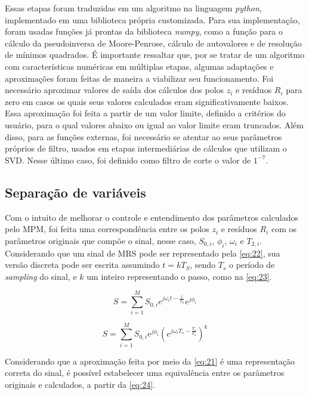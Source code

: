 \documentclass[12pt]{article}
\begin{document}
Essas etapas foram traduzidas em um algoritmo na linguagem \textit{python}, implementado em uma biblioteca própria customizada. Para sua implementação, 
foram usadas funções já prontas da biblioteca \textit{numpy}, como a função para o cálculo da pseudoinversa de Moore-Penrose, cálculo de autovalores e de resolução de 
mínimos quadrados. É importante ressaltar que, por se tratar de um algoritmo com características numéricas em múltiplas etapas, algumas adaptações e 
aproximações foram feitas de maneira a viabilizar seu funcionamento. Foi necessário aproximar valores de saída dos cálculos dos polos $z_i$ e resíduos 
$R_i$ para zero em casos os quais seus valores calculados eram significativamente baixos. Essa aproximação foi feita a partir de um valor limite, definido 
a critérios do usuário, para o qual valores abaixo ou igual ao valor limite eram truncados. Além disso, para as funções externas, foi necessário se atentar 
ao seus parâmetros próprios de filtro, usados em etapas intermediárias de cálculos que utilizam o SVD. Nesse último caso, foi definido como filtro de corte o 
valor de $1^{-7}$.

\subsection{Separação de variáveis}

Com o intuito de melhorar o controle e entendimento dos parâmetros calculados pelo MPM, foi feita uma correspondência entre os polos $z_i$ e resíduos $R_i$ com
os parâmetros originais que compõe o sinal, nesse caso, $S_{0, i}$, $\phi_i$, $\omega_i$ e $T_{2, i}$. Considerando que um sinal de MRS pode ser representado pela 
\autoref{eq:22}, sua versão discreta pode ser escrita assumindo $t = kT_S$, sendo $T_s$ o período de \textit{sampling} do sinal, e $k$ um inteiro representando o 
passo, como na \autoref{eq:23}.

\begin{equation} \label{eq:22}
    S = \sum_{i=1}^{M} S_{0, i} e^{j\omega_i t -\frac{t}{T_2}}e^{j \phi_i} 
\end{equation}

\begin{equation} \label{eq:23}
    S = \sum_{i=1}^{M} S_{0, i} e^{j \phi_i}  (e^{j\omega_i T_s -\frac{T_s}{T_2}})^k 
\end{equation}

Considerando que a aproximação feita por meio da \autoref{eq:21} é uma representação correta do sinal, é possível estabelecer uma equivalência 
entre os parâmetros originais e calculados, a partir da \autoref{eq:24}.
\end{document}
